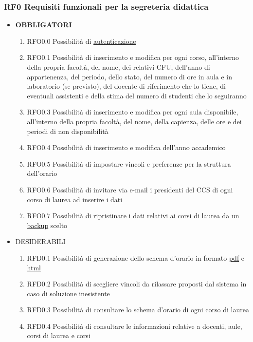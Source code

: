 \documentclass[11pt,a4paper]{article}
\begin{document}
\subsubsection{RF0 Requisiti funzionali per la segreteria didattica}
\begin{itemize}
\item \textbf{OBBLIGATORI}
\begin{enumerate}
\item RFO0.0 Possibilità di \underline{autenticazione}
\item RFO0.1 Possibilità di inserimento e modifica per ogni corso, all'interno della propria facoltà, del nome, dei relativi CFU, dell'anno di appartenenza, del periodo, dello stato, del numero di ore in aula e in laboratorio (se previsto), del docente di riferimento che lo tiene, di eventuali assistenti e della stima del numero di studenti che lo seguiranno
\item RFO0.3 Possibilità di inserimento e modifica per ogni aula disponibile, all'interno della propria facoltà, del nome, della capienza, delle ore e dei periodi di non disponibilità
\item RFO0.4 Possibilità di inserimento e modifica dell'anno accademico
\item RFO0.5 Possibilità di impostare vincoli e preferenze per la struttura dell'orario %
\item RFO0.6 Possibilità di invitare via e-mail i presidenti del CCS di ogni corso di laurea ad inserire i dati
\item RFO0.7 Possibilità di ripristinare i dati relativi ai corsi di laurea da un \underline{backup} scelto
\end{enumerate}
\item \textsc{DESIDERABILI}
\begin{enumerate}
\item RFD0.1 Possibilità di generazione dello schema d'orario in formato \underline{pdf} e \underline{html}
\item RFD0.2 Possibilità di scegliere vincoli da rilassare proposti dal sistema in caso di soluzione inesistente
\item RFD0.3 Possibilità di consultare lo schema d'orario di ogni corso di laurea
\item RFD0.4 Possibilità di consultare le informazioni relative a docenti, aule, corsi di laurea e corsi
\end{enumerate}
\end{itemize}
\end{document}
